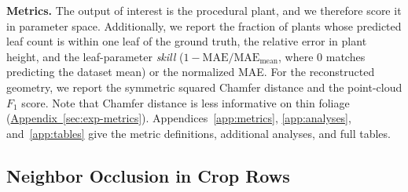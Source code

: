 \documentclass[10pt,twocolumn,letterpaper]{article}
\newcommand{\tabref}[1]{\hyperref[#1]{Table~\ref*{#1}}}
\newcommand{\appendixref}[1]{\hyperref[#1]{Appendix~\ref*{#1}}}
\begin{document}
\noindent\textbf{Metrics.}
The output of interest is the procedural plant, and we therefore score it in parameter space. Additionally, we report the fraction of plants whose predicted leaf count is within one leaf of the ground truth, the relative error in plant height, and the leaf-parameter \emph{skill} ($1 - \mathrm{MAE}/\mathrm{MAE}_{\mathrm{mean}}$, where $0$ matches predicting the dataset mean) or the normalized MAE. For the reconstructed geometry, we report the symmetric squared Chamfer distance and the point-cloud $F_1$ score. Note that Chamfer distance is less informative on thin foliage (\appendixref{sec:exp-metrics}). \textcolor{cvprblue}{Appendices}~\ref{app:metrics}, \ref{app:analyses}, and~\ref{app:tables} give the metric definitions, additional analyses, and full tables.

\subsection{Neighbor Occlusion in Crop Rows}
\label{sec:regime3}\label{sec:exp-occlusion}

\begin{table}[t]
  \caption{\textbf{The same test plants in isolation and in simulated crop rows} (2{,}250 test plants per species, ten row orientations). Chamfer distance to the target plant is in $10^{-4}\,\mathrm{m}^2$, and MAE is the leaf-parameter MAE on rows. \tabref{tab:rows} gives all inputs with confidence intervals.}
  \label{tab:rows-main}
  \centering\scriptsize
  \setlength{\tabcolsep}{3pt}
\end{table}
\end{document}
